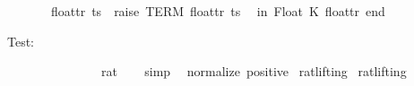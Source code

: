 \begin{isabellebody}
\ \ \ \ \ \ {\isacharbar}{\kern0pt}\ float{\isacharunderscore}{\kern0pt}tr\ ts\ {\isacharequal}{\kern0pt}\ raise\ TERM\ {\isacharparenleft}{\kern0pt}{\isachardoublequote}{\kern0pt}float{\isacharunderscore}{\kern0pt}tr{\isachardoublequote}{\kern0pt}{\isacharcomma}{\kern0pt}\ ts{\isacharparenright}{\kern0pt}{\isacharsemicolon}{\kern0pt}\isanewline
\ \ in\ {\isacharbrackleft}{\kern0pt}{\isacharparenleft}{\kern0pt}\isactrlsyntaxUNDERSCOREconst {\isasymopen}{\isacharunderscore}{\kern0pt}Float{\isasymclose}{\isacharcomma}{\kern0pt}\ K\ float{\isacharunderscore}{\kern0pt}tr{\isacharparenright}{\kern0pt}{\isacharbrackright}{\kern0pt}\ end\isanewline
{\isacartoucheclose}%
\endisatagML
{\isafoldML}%
%
\isadelimML
%
\endisadelimML
%
\begin{isamarkuptext}%
Test:%
\end{isamarkuptext}\isamarkuptrue%
\isamarkupfalse%
\ {\isachardoublequoteopen}{}{}{}{\isachardot}{\kern0pt}{}{}{}\ {\isacharequal}{\kern0pt}\ {\isacharminus}{\kern0pt}{}{}{}{\isachardot}{\kern0pt}{}{}{}\ {\isacharplus}{\kern0pt}\ {}{}{}\ {\isacharplus}{\kern0pt}\ {}{}\ {\isacharplus}{\kern0pt}\ {}\ {\isacharplus}{\kern0pt}\ {}{\isacharslash}{\kern0pt}{}{}\ {\isacharplus}{\kern0pt}\ {}{\isacharslash}{\kern0pt}{}{}{}\ {\isacharplus}{\kern0pt}\ {\isacharparenleft}{\kern0pt}{}{\isacharslash}{\kern0pt}{}{}{}{}{\isacharcolon}{\kern0pt}{\isacharcolon}{\kern0pt}rat{\isacharparenright}{\kern0pt}{\isachardoublequoteclose}\isanewline
%
\isadelimproof
\ \ %
\endisadelimproof
%
\isatagproof
{}\isamarkupfalse%
\ simp%
\endisatagproof
{\isafoldproof}%
%
\isadelimproof
%
\endisadelimproof
%
\isadelimdocument
%
\endisadelimdocument
%
\isatagdocument
%
\isamarkuptrue%
%
\endisatagdocument
{\isafolddocument}%
%
\isadelimdocument
%
\endisadelimdocument
{}\isamarkupfalse%
\ {\isacharparenleft}{\kern0pt}\ normalize\ positive\isanewline
\isanewline
{}\isamarkupfalse%
\ rat{\isachardot}{\kern0pt}lifting\isanewline
{}\isamarkupfalse%
\ rat{\isachardot}{\kern0pt}lifting\isanewline
%
\isadelimtheory
\isanewline
%
\endisadelimtheory
%
\isatagtheory
{}\isamarkupfalse%
%
\endisatagtheory
{\isafoldtheory}%
%
\isadelimtheory
%
\endisadelimtheory
%
\end{isabellebody}%

